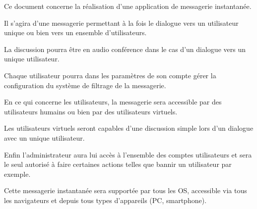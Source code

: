 	\par Ce document concerne la réalisation d'une application de messagerie instantanée.
	\par Il s’agira d’une messagerie permettant à la fois le dialogue vers un utilisateur unique ou bien vers un ensemble d’utilisateurs.
	\par La discussion pourra être en audio conférence dans le cas d’un dialogue vers un unique utilisateur.
	\par Chaque utilisateur pourra dans les paramètres de son compte gérer la configuration du système de filtrage de la messagerie. \\

	\par En ce qui concerne les utilisateurs, la messagerie sera accessible par des utilisateurs humains ou bien par des utilisateurs virtuels.
	\par Les utilisateurs virtuels seront capables d’une discussion simple lors d’un dialogue avec un unique utilisateur.
	\par Enfin l’administrateur aura lui accès à l’ensemble des comptes utilisateurs et sera le seul autorisé à faire certaines actions telles que bannir un utilisateur par exemple. \\

	\par Cette messagerie instantanée sera supportée par tous les OS, accessible via tous les navigateurs et depuis tous types d’appareils (PC, smartphone).
